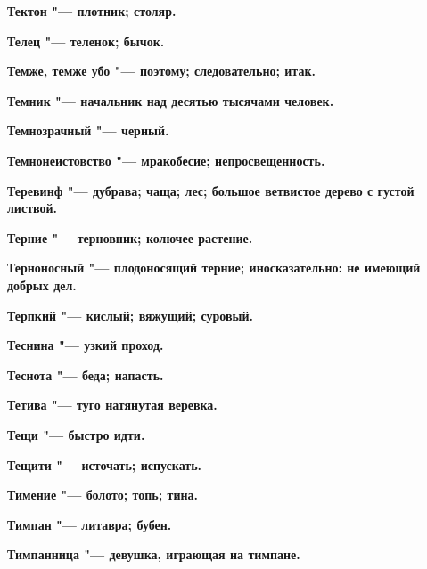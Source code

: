 \bfseries Тектон \normalfont{} "--- плотник; столяр. 




\bfseries Телец \normalfont{} "--- теленок; бычок. 




\bfseries Темже, темже убо \normalfont{} "--- поэтому; следовательно; итак. 




\bfseries Темник \normalfont{} "--- начальник над десятью тысячами человек. 




\bfseries Темнозрачный \normalfont{} "--- черный. 




\bfseries Темнонеистовство \normalfont{} "--- мракобесие; непросвещенность. 




\bfseries Теревинф \normalfont{} "--- дубрава; чаща; лес; большое ветвистое дерево с густой листвой. 




\bfseries Терние \normalfont{} "--- терновник; колючее растение. 




\bfseries Терноносный \normalfont{} "--- плодоносящий терние; иносказательно: не имеющий добрых дел. 




\bfseries Терпкий \normalfont{} "--- кислый; вяжущий; суровый. 




\bfseries Теснина \normalfont{} "--- узкий проход. 




\bfseries Теснота \normalfont{} "--- беда; напасть. 




\bfseries Тетива \normalfont{} "--- туго натянутая веревка. 




\bfseries Тещи \normalfont{} "--- быстро идти. 




\bfseries Тещити \normalfont{} "--- источать; испускать. 




\bfseries Тимение \normalfont{} "--- болото; топь; тина. 




\bfseries Тимпан \normalfont{} "--- литавра; бубен. 




\bfseries Тимпанница \normalfont{} "--- девушка, играющая на тимпане. 




